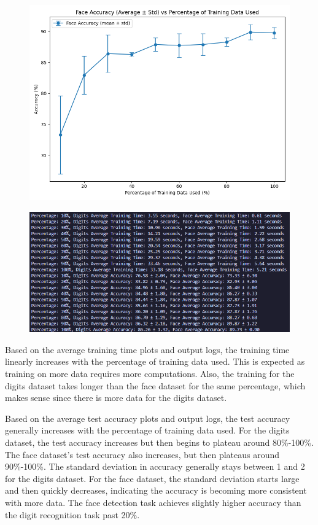 \documentclass{article}
\begin{document}
\begin{figure}[H]
    \centering
    \includegraphics[width=.75\textwidth]{report/report_figures/pytorch_face_acc.png}
\end{figure}
\begin{figure}[H]
    \centering
    \includegraphics[width=.75 \textwidth]{report/report_figures/pytorch_output_log.png}
\end{figure}

\noindent Based on the average training time plots and output logs, the training time linearly increases with the percentage of training data used. This is expected as training on more data requires more computations. Also, the training for the digits dataset takes longer than the face dataset for the same percentage, which makes sense since there is more data for the digits dataset.

\noindent Based on the average test accuracy plots and output logs, the test accuracy generally increases with the percentage of training data used. For the digits dataset, the test accuracy increases but then begins to plateau around 80\%-100\%. The face dataset's test accuracy also increases, but then plateaus around 90\%-100\%. The standard deviation in accuracy generally stays between 1 and 2 for the digits dataset. For the face dataset, the standard deviation starts large and then quickly decreases, indicating the accuracy is becoming more consistent with more data. The face detection task achieves slightly higher accuracy than the digit recognition task past 20\%.
\end{document}

